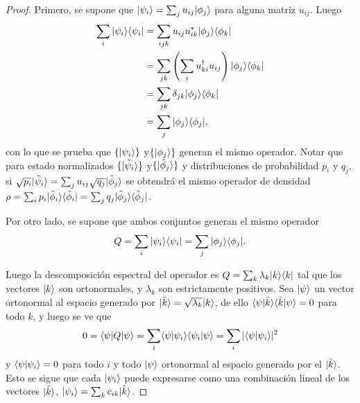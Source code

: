 \begin{proof}
	
	Primero, se supone que $|\psi_i\rangle= \sum_{j}u_{ij}|\phi_j\rangle$ para alguna matriz $u_{ij}$. Luego \begin{equation*}
		\begin{split}
			\sum_{i}|\psi_i\rangle \langle \psi_i|&=\sum_{ijk} u_{ij}u_{ik}^*|\phi_j\rangle \langle \phi_k|\\
			&=\sum_{jk}\left(\sum_i  u_{ki}^\dagger u_{ij}\right) |\phi_j\rangle \langle \phi_k|\\
			&=\sum_{jk}\delta_{jk}|\phi_j\rangle \langle \phi_k|\\
			&=\sum_{j} |\phi_j\rangle \langle \phi_j|,\\
	\end{split}
	\end{equation*}	
	con lo que se prueba que $\{|\psi_i\rangle\}$ y$ \{|\phi_j\rangle \}$ generan el mismo operador. Notar que para estado normalizados $\{|\tilde{\psi}_i\rangle\}$ y$ \{|\tilde{\phi}_j\rangle \}$ y distribuciones de probabilidad $p_i$ y $q_j$, si $\sqrt{p_i}|\tilde{\psi}_i\rangle=\sum_{j} u_{ij} \sqrt{q_j}|\tilde{\phi}_j\rangle$ se obtendrá el mismo operador de densidad $\rho=\sum_i p_i |\tilde{\phi}_i\rangle \langle\tilde{\phi}_i|= \sum_j q_j|\tilde{\phi}_j \rangle \langle\tilde{\phi}_j| $.
	
Por otro lado,  se supone que ambos conjuntos generan el mismo operador
\[Q=\sum_{i}|\psi_i\rangle \langle \psi_i|=\sum_{j} |\phi_j\rangle \langle \phi_j|.\]
	
Luego la  descomposición espectral del operador es $Q = \sum_k \lambda_k |k \rangle \langle k|$ tal que los vectores $ |k\rangle$ son ortonormales, y $\lambda_k$ son estrictamente  positivos. Sea $|\psi\rangle$  un vector ortonormal al espacio generado por $|\tilde{k}\rangle=\sqrt{\lambda_k}|k\rangle$, de ello $\langle \psi|\tilde{k}\rangle \langle \tilde{k}|\psi\rangle=0$ para todo $ k$, y luego se ve que 	\[0=\langle \psi |Q|\psi\rangle=\sum_{i}\langle\psi|\psi_i\rangle \langle \psi_i|\psi \rangle =\sum_i |\langle\psi|\psi_i\rangle|^2 \] y $\langle\psi|\psi_i\rangle=0$ para todo $i$ y todo $|\psi \rangle$ ortonormal al espacio generado  por el $|\tilde{k}\rangle$. Esto se sigue que cada $|\psi_i\rangle $ puede expresarse como una combinación lineal de los vectores  $|\tilde{k}\rangle$, $|\psi_i\rangle=\sum_k c_{ik} |\tilde{k}\rangle$. 
	

\end{proof}
